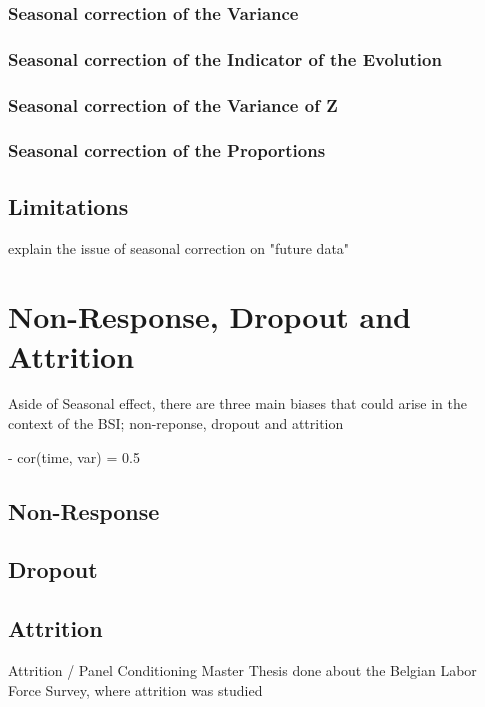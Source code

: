 \documentclass[12pt,a4paper,oneside]{book}
\begin{document}
\subsection{Seasonal correction of the Variance}

\subsection{Seasonal correction of the Indicator of the Evolution}

\subsection{Seasonal correction of the Variance of Z}

\subsection{Seasonal correction of the Proportions}

\section{Limitations}

explain the issue of seasonal correction on "future data" 



\chapter{Non-Response, Dropout and Attrition}

Aside of Seasonal effect, there are three main biases that could arise in the context of the BSI; non-reponse, dropout and attrition

- cor(time, var) = 0.5


\section{Non-Response}

\section{Dropout}

\section{Attrition}
Attrition / Panel Conditioning 
Master Thesis done about the Belgian Labor Force Survey, where  attrition was studied \cite{priyana_hardjawidjaksana_investigating_2019}
\end{document}
